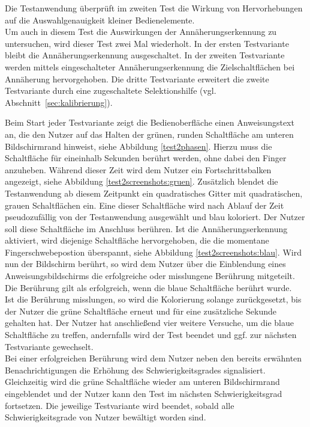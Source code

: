 \documentclass[12pt,numbers=noenddot,parskip,bibliography=totocnumbered,listof=totocnumbered]{scrreprt}
\begin{document}
Die Testanwendung überprüft im zweiten Test die Wirkung von Hervorhebungen auf die Auswahlgenauigkeit kleiner Bedienelemente.\\
Um auch in diesem Test die Auswirkungen der Annäherungserkennung zu untersuchen, wird dieser Test zwei Mal wiederholt. In der ersten Testvariante bleibt die Annäherungserkennung ausgeschaltet. In der zweiten Testvariante werden mittels eingeschalteter Annäherungserkennung die Zielschaltflächen bei Annäherung hervorgehoben. Die dritte Testvariante erweitert die zweite Testvariante durch eine zugeschaltete Selektionshilfe (vgl. Abschnitt~\ref{sec:kalibrierung}).

Beim Start jeder Testvariante zeigt die Bedienoberfläche einen Anweisungstext an, die den Nutzer auf das Halten der grünen, runden Schaltfläche am unteren Bildschirmrand hinweist, siehe Abbildung \ref{test2phasen}. Hierzu muss die Schaltfläche für eineinhalb Sekunden berührt werden, ohne dabei den Finger anzuheben. Während dieser Zeit wird dem Nutzer ein Fortschrittsbalken angezeigt, siehe Abbildung \ref{test2screenshots:gruen}. Zusätzlich blendet die Testanwendung ab diesem Zeitpunkt ein quadratisches Gitter mit quadratischen, grauen Schaltflächen ein. Eine dieser Schaltfläche wird nach Ablauf der Zeit pseudozufällig von der Testanwendung ausgewählt und blau koloriert. Der Nutzer soll diese Schaltfläche im Anschluss berühren. Ist die Annäherungserkennung aktiviert, wird diejenige Schaltfläche hervorgehoben, die die momentane Fingerschwebepostion überspannt, siehe Abbildung \ref{test2screenshots:blau}. Wird nun der Bildschirm berührt, so wird dem Nutzer über die Einblendung eines Anweisungsbildschirms die erfolgreiche oder misslungene Berührung mitgeteilt. Die Berührung gilt als erfolgreich, wenn die blaue Schaltfläche berührt wurde.\\
Ist die Berührung misslungen, so wird die Kolorierung solange zurückgesetzt, bis der Nutzer die grüne Schaltfläche erneut und für eine zusätzliche Sekunde gehalten hat. Der Nutzer hat anschließend vier weitere Versuche, um die blaue Schaltfläche zu treffen, andernfalls wird der Test beendet und ggf. zur nächsten Testvariante gewechselt.\\
Bei einer erfolgreichen Berührung wird dem Nutzer neben den bereits erwähnten Benachrichtigungen die Erhöhung des Schwierigkeitsgrades signalisiert. Gleichzeitig wird die grüne Schaltfläche wieder am unteren Bildschirmrand eingeblendet und der Nutzer kann den Test im nächsten Schwierigkeitsgrad fortsetzen. Die jeweilige Testvariante wird beendet, sobald alle Schwierigkeitsgrade von Nutzer bewältigt worden sind.
\end{document}
